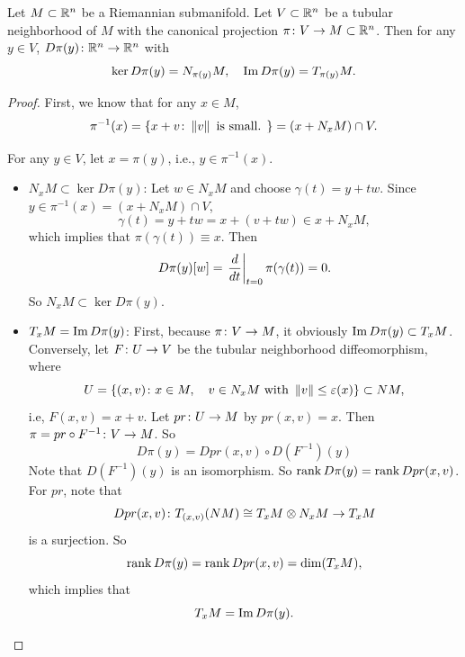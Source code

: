 \begin{lem}\label{lem:diff_of_pi}
    Let $M \subset \mathbb{R}^n$ be a Riemannian submanifold. Let $V \subset \mathbb{R}^n$ be a tubular neighborhood of $M$ with the canonical projection $\pi \colon V \rightarrow M \subset \mathbb{R}^n$. Then for any $y \in V$, $D\pi(y) \colon \mathbb{R}^n \rightarrow \mathbb{R}^n$ with
    \begin{equation*}
        \ker D\pi(y) = N_{\pi(y)} M,\quad \operatorname{Im} D\pi(y) = T_{\pi(y)}M.
    \end{equation*}
\end{lem}
\begin{proof}
    First, we know that for any $x \in M$,
    \begin{equation*}
        \pi^{-1}(x) = \left\{x+v \colon \left\lVert v\right\lVert \text{ is small. }\right\} = (x + N_xM) \cap V.
    \end{equation*}

    For any $y \in V$, let $x = \pi(y)$, i.e., $y \in \pi^{-1}(x)$.
    \begin{itemize}
        \item $N_xM \subset \ker D\pi(y)$: Let $w \in N_xM$ and choose $\gamma(t) = y + tw$. Since $y \in \pi^{-1}(x) = (x + N_xM) \cap V$,
        \begin{equation*}
            \gamma(t) = y + tw = x + (v + tw) \in x + N_xM,
        \end{equation*}
        which implies that $\pi(\gamma(t)) \equiv x$. Then
        \begin{equation*}
            D\pi(y)[w] = \left.\frac{d}{dt}\right\lvert_{t = 0}\pi(\gamma(t)) = 0.
        \end{equation*}
        So $N_xM \subset \ker D\pi(y)$.

        \item $T_xM = \operatorname{Im} D\pi(y)$: First, because $\pi \colon V \rightarrow M$, it obviously $\operatorname{Im} D\pi(y) \subset T_xM$. Conversely, let $F \colon U \rightarrow V$ be the tubular neighborhood diffeomorphism, where
        \begin{equation*}
            U = \left\{(x,v) \colon x\in M,\quad v \in N_xM \text{ with } \left\lVert v\right\lVert \leq \varepsilon(x)\right\} \subset NM,
        \end{equation*}
        i.e, $F(x,v) = x+v$. Let $pr \colon U \rightarrow M$ by $pr(x,v) = x$. Then $\pi = pr \circ F^{-1} \colon V \rightarrow M$. So
        \begin{equation*}
            D\pi(y) = Dpr(x,v) \circ D(F^{-1})(y)
        \end{equation*}
        Note that $D(F^{-1})(y)$ is an isomorphism. So $\operatorname{rank} D\pi(y) = \operatorname{rank} Dpr(x,v)$. For $pr$, note that
        \begin{equation*}
            Dpr(x,v) \colon T_{(x,v)}(NM) \cong T_xM \otimes N_xM \rightarrow T_xM
        \end{equation*}
        is a surjection. So
        \begin{equation*}
            \operatorname{rank} D\pi(y) = \operatorname{rank} Dpr(x,v) = \operatorname{dim} (T_xM),
        \end{equation*}
        which implies that
        \begin{equation*}
            T_xM = \operatorname{Im} D\pi(y).
        \end{equation*}


\end{itemize}
\end{proof}

